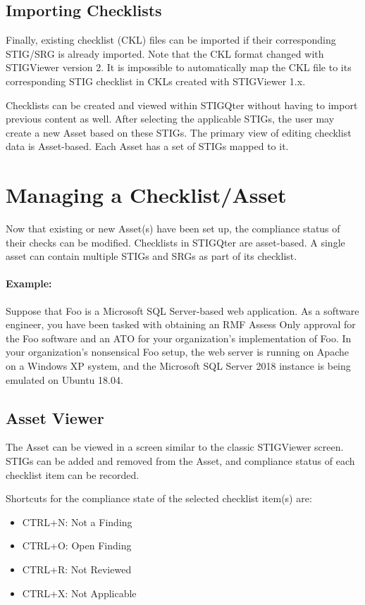 \documentclass[letterpaper, 10pt, twoside]{article}
\begin{document}
\subsection{Importing Checklists}

Finally, existing checklist (CKL) files can be imported if their corresponding STIG/SRG is already imported. Note that the CKL format changed with STIGViewer version 2. It is impossible to automatically map the CKL file to its corresponding STIG checklist in CKLs created with STIGViewer 1.x.

Checklists can be created and viewed within STIGQter without having to import previous content as well. After selecting the applicable STIGs, the user may create a new Asset based on these STIGs. The primary view of editing checklist data is Asset-based. Each Asset has a set of STIGs mapped to it.

\section{Managing a Checklist/Asset}

Now that existing or new Asset(s) have been set up, the compliance status of their checks can be modified. Checklists in STIGQter are asset-based. A single asset can contain multiple STIGs and SRGs as part of its checklist.

\paragraph{Example:} Suppose that Foo is a Microsoft SQL Server-based web application. As a software engineer, you have been tasked with obtaining an RMF Assess Only approval for the Foo software and an ATO for your organization's implementation of Foo. In your organization's nonsensical Foo setup, the web server is running on Apache on a Windows XP system, and the Microsoft SQL Server 2018 instance is being emulated on Ubuntu 18.04.

\subsection{Asset Viewer}

The Asset can be viewed in a screen similar to the classic STIGViewer screen. STIGs can be added and removed from the Asset, and compliance status of each checklist item can be recorded.

Shortcuts for the compliance state of the selected checklist item(s) are:
\begin{itemize}
	\item CTRL+N: Not a Finding
	\item CTRL+O: Open Finding
	\item CTRL+R: Not Reviewed
	\item CTRL+X: Not Applicable
\end{itemize}
\end{document}
